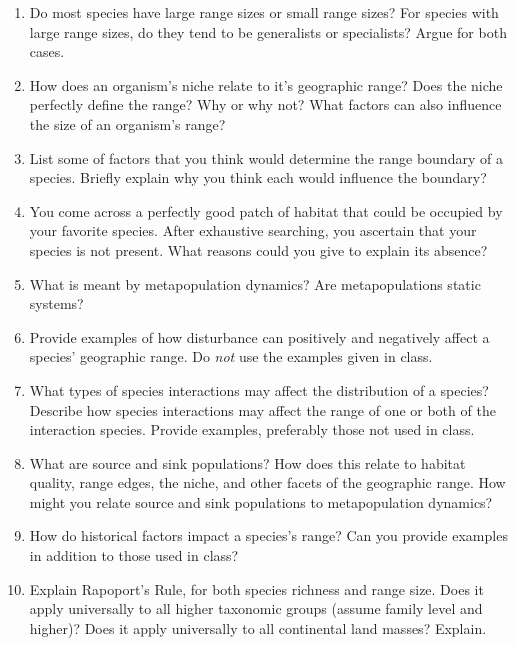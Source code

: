 \documentclass[letterpaper]{tufte-handout}
\begin{document}
\begin{enumerate}

\item   Do most species have large range sizes or small range sizes? For
  species with large range sizes, do they tend to be generalists or
  specialists? Argue for both cases.
  
\item   How does an organism's niche relate to it's geographic range? Does the
  niche perfectly define the range? Why or why not? What factors can
  also influence the size of an organism's range?
  
\item  List some of factors that you think would determine the range boundary
  of a species. Briefly explain why you think each would influence the
  boundary?
  
\item   You come across a perfectly good patch of habitat that could be
  occupied by your favorite species. After exhaustive searching, you
  ascertain that your species is not present. What reasons could you
  give to explain its absence?
  
\item  What is meant by metapopulation dynamics? Are metapopulations static
  systems?
  
\item  Provide examples of how disturbance can positively and negatively
  affect a species' geographic range. Do \emph{not} use the examples
  given in class.
  
\item  What types of species interactions may affect the distribution of a
  species? Describe how species interactions may affect the range of one
  or both of the interaction species. Provide examples, preferably those
  not used in class.
  
\item  What are source and sink populations? How does this relate to habitat
  quality, range edges, the niche, and other facets of the geographic
  range. How might you relate source and sink populations to
  metapopulation dynamics?
  
\item  How do historical factors impact a species's range? Can you provide
  examples in addition to those used in class?

\item  Explain Rapoport's Rule, for both species richness and range size. 
Does it apply universally to all higher taxonomic groups (assume family 
level and higher)? Does it apply universally
to all continental land masses? Explain.


\end{enumerate}
\end{document}
